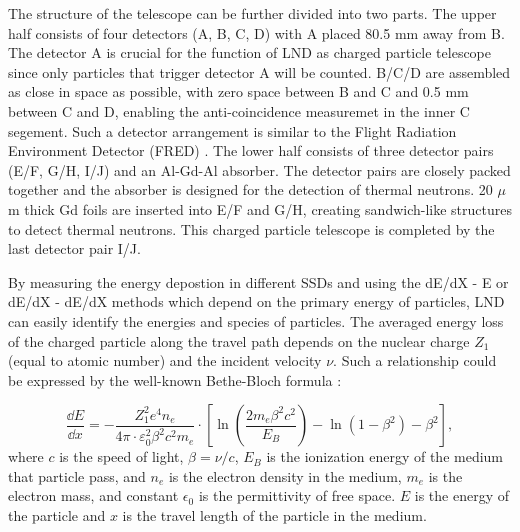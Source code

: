 The structure of the telescope can be further divided into two parts. The upper half consists of four detectors (A, B, C, D) with A placed 80.5 mm away from B. The detector A is crucial for the function of \ac{LND} as charged particle telescope since only particles that trigger detector A will be counted. B/C/D are assembled as close in space as possible, with zero space between B and C and 0.5 mm between C and D, enabling the anti-coincidence measuremet in the inner C segement. Such a detector arrangement is similar to the Flight Radiation Environment Detector (FRED) \citep{moeller-etal-2013, moeller-etal-2013b}. The lower half consists of three detector pairs (E/F, G/H, I/J) and an Al-Gd-Al absorber. The detector pairs are closely packed together and the absorber is designed for the detection of thermal neutrons. 20 $\mu$m thick Gd foils are inserted into E/F and G/H, creating sandwich-like structures to detect thermal neutrons. This charged particle telescope is completed by the last detector pair I/J.

By measuring the energy depostion in different \acp{SSD} and using the dE/dX - E or dE/dX - dE/dX methods which depend on the primary energy of particles, LND can easily identify the energies and species of particles. 
The averaged energy loss of the charged particle along the travel path depends on the nuclear charge $Z_1$ (equal to atomic number) and the incident velocity $\nu$. 
Such a relationship could be expressed by the well-known Bethe-Bloch formula \citep{bethe-1930, bloch-1933}:

\begin{equation}
    \frac{\dd E}{\dd x} = - \frac{Z_1^2 e^4 n_e}{4 \pi \cdot \varepsilon_0^2 \beta^2 c^2 m_e} \cdot \left[ \ln\left(\frac{2 m_e  \beta^2 c^2}{{E_B}}\right) - \ln(1 - \beta^2) - \beta^2  \right], 
    \label{eq:BB}
  \end{equation}
where $c$ is the speed of light, $\beta = \nu/c$, $E_B$ is the ionization energy of the medium that particle pass, and $n_e$ is the electron density in the medium, $m_e$ is the electron mass, and constant $\epsilon_0$ is the permittivity of free space. $E$ is the energy of the particle and $x$ is the travel length of the particle in the medium.

